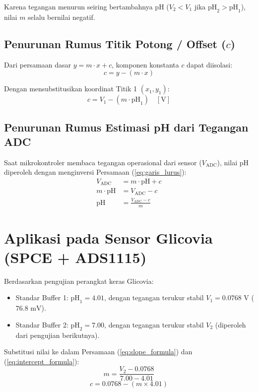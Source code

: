 \documentclass[12pt,a4paper]{article}
\begin{document}
Karena tegangan menurun seiring bertambahnya pH ($V_2 < V_1$ jika $\text{pH}_2 > \text{pH}_1$), nilai $m$ selalu bernilai negatif.

\subsection{Penurunan Rumus Titik Potong / Offset ($c$)}

Dari persamaan dasar $y = m \cdot x + c$, komponen konstanta $c$ dapat diisolasi:
\begin{equation}
c = y - (m \cdot x)
\end{equation}

Dengan mensubstitusikan koordinat Titik 1 $(x_1, y_1)$:
\begin{equation}
\label{eq:intercept_formula}
c = V_1 - (m \cdot \text{pH}_1) \quad [\text{V}]
\end{equation}

\subsection{Penurunan Rumus Estimasi pH dari Tegangan ADC}

Saat mikrokontroler membaca tegangan operasional dari sensor ($V_{\text{ADC}}$), nilai pH diperoleh dengan menginversi Persamaan (\ref{eq:garis_lurus}):
\begin{align}
V_{\text{ADC}} &= m \cdot \text{pH} + c \nonumber \\
m \cdot \text{pH} &= V_{\text{ADC}} - c \nonumber \\
\text{pH} &= \frac{V_{\text{ADC}} - c}{m} \label{eq:ph_calc}
\end{align}

\section{Aplikasi pada Sensor Glicovia (SPCE + ADS1115)}

Berdasarkan pengujian perangkat keras Glicovia:
\begin{itemize}
    \item Standar Buffer 1: $\text{pH}_1 = 4.01$, dengan tegangan terukur stabil $V_1 = 0.0768\text{ V}$ ($76.8\text{ mV}$).
    \item Standar Buffer 2: $\text{pH}_2 = 7.00$, dengan tegangan terukur stabil $V_2$ (diperoleh dari pengujian berikutnya).
\end{itemize}

Substitusi nilai ke dalam Persamaan (\ref{eq:slope_formula}) dan (\ref{eq:intercept_formula}):
\begin{equation}
m = \frac{V_2 - 0.0768}{7.00 - 4.01}
\end{equation}
\begin{equation}
c = 0.0768 - (m \times 4.01)
\end{equation}
\end{document}
